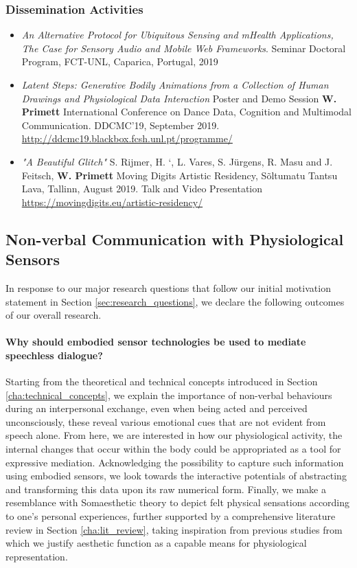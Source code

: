 \subsubsection{Dissemination Activities}
    \begin{itemize}

    \item[] \textit{An Alternative Protocol for Ubiquitous Sensing and mHealth Applications, The Case for Sensory Audio and Mobile Web Frameworks}. Seminar Doctoral Program, FCT-UNL, Caparica, Portugal, 2019

    \item[] \textit{Latent Steps: Generative Bodily Animations from a Collection of Human Drawings and Physiological Data Interaction} Poster and Demo Session
    \textbf{W. Primett}
    International Conference on Dance Data, Cognition and Multimodal Communication. DDCMC’19, September 2019.
    \url{http://ddcmc19.blackbox.fcsh.unl.pt/programme/}

    \item[] \textit{"A Beautiful Glitch"}
        S. Rijmer, H. `, L. Vares, S. Jürgens, R. Masu and J. Feitsch, \textbf{W. Primett}
    Moving Digits Artistic Residency, Sõltumatu Tantsu Lava, Tallinn, August 2019. Talk and Video Presentation
    \url{https://movingdigits.eu/artistic-residency/}
    \end{itemize}

\subsection{Non-verbal Communication with Physiological Sensors}

In response to our major research questions that follow our initial motivation statement in Section \ref{sec:research_questions}, we declare the following outcomes of our overall research.

\paragraph{Why should embodied sensor technologies be used to mediate speechless dialogue?}

Starting from the theoretical and technical concepts introduced in Section \ref{cha:technical_concepts}, we explain the importance of non-verbal behaviours during an interpersonal exchange, even when being acted and perceived unconsciously, these reveal various emotional cues that are not evident from speech alone. From here, we are interested in how our physiological activity, the internal changes that occur within the body could be appropriated as a tool for expressive mediation. Acknowledging the possibility to capture such information using embodied sensors, we look towards the interactive potentials of abstracting and transforming this data upon its raw numerical form. Finally, we make a resemblance with Somaesthetic theory to depict felt physical sensations according to one's personal experiences, further supported by a comprehensive literature review in Section \ref{cha:lit_review}, taking inspiration from previous studies from which we justify aesthetic function as a capable means for physiological representation.

